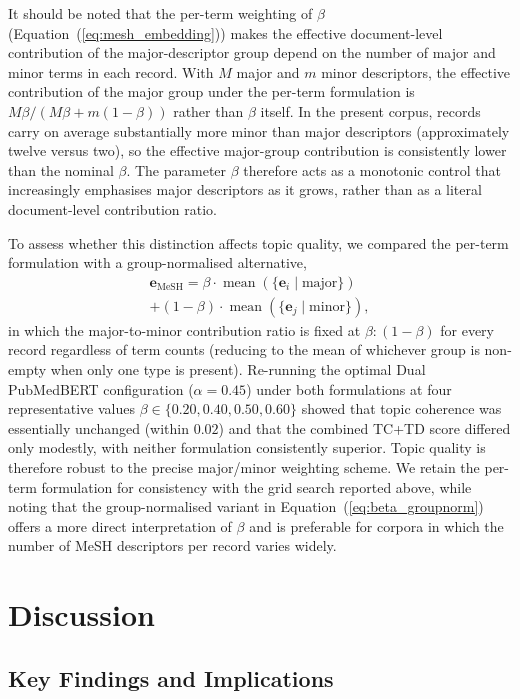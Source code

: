 \documentclass[authorproof,JACIII,researchpaper]{fujipressarticle}
\begin{document}
It should be noted that the per-term weighting of $\beta$ (Equation~(\ref{eq:mesh_embedding})) makes the effective document-level contribution of the major-descriptor group depend on the number of major and minor terms in each record. With $M$ major and $m$ minor descriptors, the effective contribution of the major group under the per-term formulation is $M\beta/(M\beta+m(1-\beta))$ rather than $\beta$ itself. In the present corpus, records carry on average substantially more minor than major descriptors (approximately twelve versus two), so the effective major-group contribution is consistently lower than the nominal $\beta$. The parameter $\beta$ therefore acts as a monotonic control that increasingly emphasises major descriptors as it grows, rather than as a literal document-level contribution ratio.

To assess whether this distinction affects topic quality, we compared the per-term formulation with a group-normalised alternative,
\begin{multline}
\boldsymbol{e}_{\text{MeSH}} = \beta\cdot\operatorname{mean}(\{\boldsymbol{e}_i \mid \text{major}\}) \\
+ (1-\beta)\cdot\operatorname{mean}(\{\boldsymbol{e}_j \mid \text{minor}\}),
\label{eq:beta_groupnorm}
\end{multline}
in which the major-to-minor contribution ratio is fixed at $\beta:(1-\beta)$ for every record regardless of term counts (reducing to the mean of whichever group is non-empty when only one type is present). Re-running the optimal Dual PubMedBERT configuration ($\alpha=0.45$) under both formulations at four representative values $\beta \in \{0.20, 0.40, 0.50, 0.60\}$ showed that topic coherence was essentially unchanged (within $0.02$) and that the combined TC+TD score differed only modestly, with neither formulation consistently superior. Topic quality is therefore robust to the precise major/minor weighting scheme. We retain the per-term formulation for consistency with the grid search reported above, while noting that the group-normalised variant in Equation~(\ref{eq:beta_groupnorm}) offers a more direct interpretation of $\beta$ and is preferable for corpora in which the number of MeSH descriptors per record varies widely.

\section{Discussion}

\subsection{Key Findings and Implications}
\end{document}
